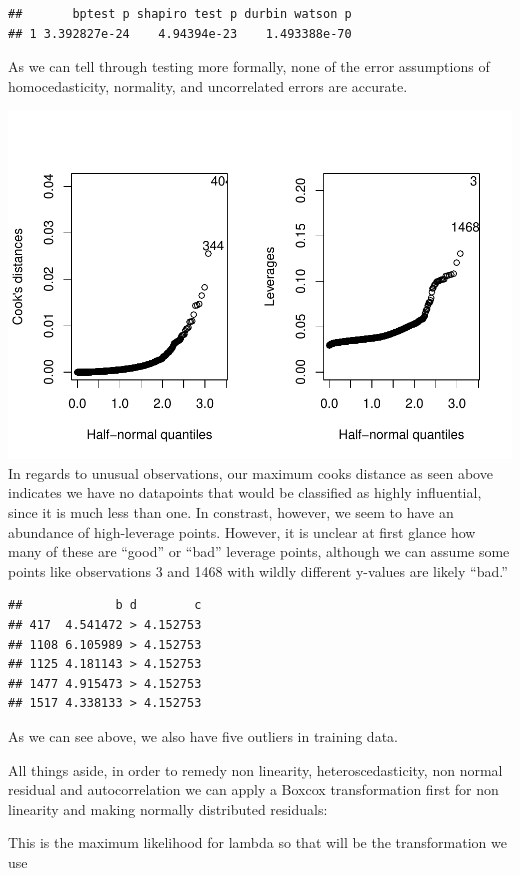 \documentclass[
]{report}
\begin{document}
\begin{verbatim}
##       bptest p shapiro test p durbin watson p
## 1 3.392827e-24    4.94394e-23    1.493388e-70
\end{verbatim}

As we can tell through testing more formally, none of the error
assumptions of homocedasticity, normality, and uncorrelated errors are
accurate.

\includegraphics{Final_7_files/figure-latex/unnamed-chunk-11-1.pdf} In
regards to unusual observations, our maximum cooks distance as seen
above indicates we have no datapoints that would be classified as highly
influential, since it is much less than one. In constrast, however, we
seem to have an abundance of high-leverage points. However, it is
unclear at first glance how many of these are ``good'' or ``bad''
leverage points, although we can assume some points like observations 3
and 1468 with wildly different y-values are likely ``bad.''

\begin{verbatim}
##             b d        c
## 417  4.541472 > 4.152753
## 1108 6.105989 > 4.152753
## 1125 4.181143 > 4.152753
## 1477 4.915473 > 4.152753
## 1517 4.338133 > 4.152753
\end{verbatim}

As we can see above, we also have five outliers in training data.

All things aside, in order to remedy non linearity, heteroscedasticity,
non normal residual and autocorrelation we can apply a Boxcox
transformation first for non linearity and making normally distributed
residuals:

This is the maximum likelihood for lambda so that will be the
transformation we use
\end{document}
